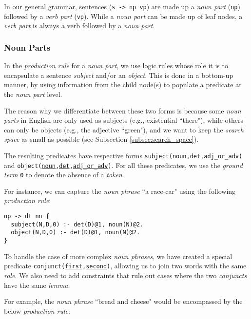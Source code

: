 In our general grammar, sentences (\texttt{s -> np vp}) are made up a \textit{noun part} (\texttt{np}) followed by a \textit{verb part} (\texttt{vp}). While a \textit{noun part} can be made up of leaf nodes, a \textit{verb part} is always a verb followed by a \textit{noun part}.

\subsubsection*{Noun Parts}

In the \textit{production rule} for a \textit{noun part}, we use logic rules whose role it is to encapsulate a sentence \textit{subject} and/or an \textit{object}. This is done in a bottom-up manner, by using information from the child node(s) to populate a predicate at the \textit{noun part} level.

The reason why we differentiate between these two forms is because some \textit{noun parts} in English are only used as subjects (e.g., existential ``there"), while others can only be objects (e.g., the adjective ``green"), and we want to keep the \textit{search space} as small as possible (see Subsection \ref{subsec:search_space}).

The resulting predicates have respective forms \texttt{subject(\underline{noun},\underline{det},\underline{adj\_or\_adv})} and \texttt{object(\underline{noun},\underline{det},\underline{adj\_or\_adv})}. For all these predicates, we use the \textit{ground term} \texttt{0} to denote the absence of a \textit{token}.

For instance, we can capture the \textit{noun phrase} ``a race-car" using the following \textit{production rule}:

\begin{displayquote}
\begin{lstlisting}
np -> dt nn {
  subject(N,D,0) :- det(D)@1, noun(N)@2.
  object(N,D,0) :- det(D)@1, noun(N)@2.
}
\end{lstlisting}
\end{displayquote}

\noindent
To handle the case of more complex \textit{noun phrases}, we have created a special predicate \texttt{conjunct(\underline{first},\underline{second})}, allowing us to join two words with the same \textit{role}. We also need to add constraints that rule out cases where the two \textit{conjuncts} have the same \textit{lemma}.

For example, the \textit{noun phrase} ``bread and cheese" would be encompassed by the below \textit{production rule}:

